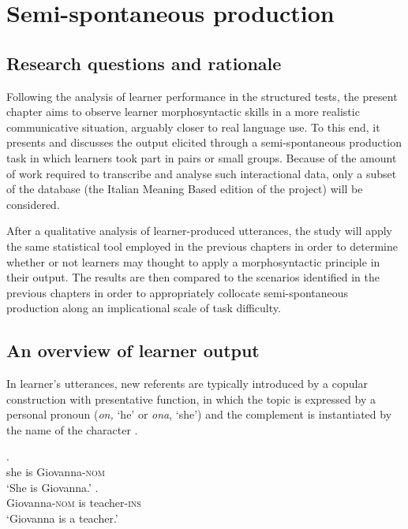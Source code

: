\chapter{Semi-spontaneous production}\label{sec:6}

\section{Research questions and rationale}\label{sec:07:1}

Following the analysis of learner performance in the structured tests, the present chapter aims to observe learner morphosyntactic skills in a more realistic communicative situation, arguably closer to real language use. To this end, it presents and discusses the output elicited through a semi-spontaneous production task in which learners took part in pairs or small groups. Because of the amount of work required to transcribe and analyse such interactional data, only a subset of the database (the Italian Meaning Based edition of the project) will be considered.

After a qualitative analysis of learner-produced utterances, the study will apply the same statistical tool employed in the previous chapters in order to determine whether or not learners may thought to apply a morphosyntactic principle in their output. The results are then compared to the scenarios identified in the previous chapters in order to appropriately collocate semi-spontaneous production along an implicational scale of task difficulty.

\section{An overview of learner output}\label{sec:07:2}

In learner’s utterances, new referents are typically introduced by a copular construction with presentative function, in which the topic is expressed by a personal pronoun (\textit{on,} ‘he’ or \textit{ona}, ‘she’) and the complement is instantiated by the name of the character .

\ea%
    \label{ex:07:1}
    \ea\label{ex:07:1a}
    .\\
            \hspaceThis{[}she  is  Giovanna-\textsc{nom}\\
    \glt    ‘She is Giovanna.’
    \ex\label{ex:07:1b}
    .  \\
            \hspaceThis{[}Giovanna-\textsc{nom}  is  teacher-\textsc{ins}\\
    \glt    ‘Giovanna is a teacher.’
    \z
\z

